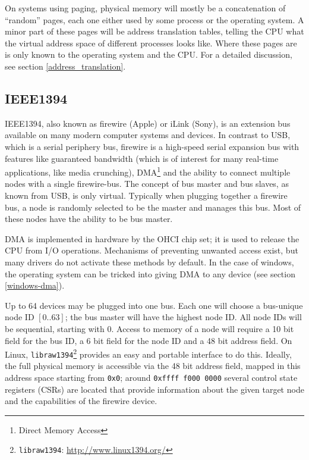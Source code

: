 On systems using paging, physical memory will mostly be a concatenation of
``random'' pages, each one either used by some process or the operating system.
A minor part of these pages will be address translation tables, telling the CPU
what the virtual address space of different processes looks like. Where these
pages are is only known to the operating system and the CPU.  For a detailed
discussion, see section \ref{address_translation}.



\subsection{IEEE1394}

\label{phys1394}
IEEE1394, also known as \epsfysize 0.3cm 
firewire (Apple) or iLink (Sony), is an extension bus available on many modern
computer systems and devices.  In contrast to USB, which is a serial periphery
bus, firewire is a high-speed serial expansion bus with features like guaranteed
bandwidth (which is of interest for many real-time applications, like media
crunching), DMA\footnote{Direct Memory Access} and the ability to connect
multiple nodes with a single firewire-bus.  The concept of bus master and bus
slaves, as known from USB, is only virtual.  Typically when plugging together a
firewire bus, a node is randomly selected to be the master and manages this bus.
Most of these nodes have the ability to be bus master.

DMA is implemented in hardware by the OHCI chip set; it is used to release the
CPU from I/O operations. Mechanisms of preventing unwanted access exist, but
many drivers do not activate these methods by default. In the case of windows,
the operating system can be tricked into giving DMA to any device (see section
\ref{windows-dma}).

Up to 64 devices may be plugged into one bus. Each one will choose a bus-unique
node ID $[0..63]$; the bus master will have the highest node ID. All node IDs
will be sequential, starting with 0. Access to memory of a node will require a
10 bit field for the bus ID, a 6 bit field for the node ID and a 48 bit address
field.  On Linux, \texttt{libraw1394}\footnote{\texttt{libraw1394}:
\href{http://www.linux1394.org/}{http://www.linux1394.org/}} provides an easy
and portable interface to do this. Ideally, the full physical memory is
accessible via the 48 bit address field, mapped in this address space starting
from \texttt{0x0}; around \texttt{0xffff~f000~0000} several control state
registers (CSRs) are located that provide information about the given target
node and the capabilities of the firewire device.

